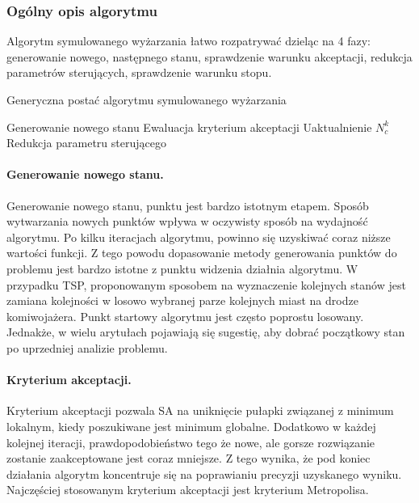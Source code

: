 \documentclass{article}
\begin{document}
\subsubsection{Ogólny opis algorytmu}
    Algorytm symulowanego wyżarzania łatwo rozpatrywać dzieląc na 4 fazy: generowanie nowego, następnego stanu, sprawdzenie warunku akceptacji, redukcja parametrów sterujących, sprawdzenie warunku stopu.
    \begin{algorithm}
        \caption{Generyczna postać algorytmu symulowanego wyżarzania}
        \begin{algorithmic}
                \STATE Generowanie nowego stanu
                \STATE Ewaluacja kryterium akceptacji
            \ENDFOR
            \STATE Uaktualnienie $N_c^k$
            \STATE Redukcja parametru sterującego
        \ENDWHILE
        \end{algorithmic}
    \end{algorithm}
    
    \paragraph{Generowanie nowego stanu.}
    Generowanie nowego stanu, punktu jest bardzo istotnym etapem. Sposób wytwarzania nowych punktów wpływa w oczywisty sposób na wydajność algorytmu. Po kilku iteracjach algorytmu, powinno się uzyskiwać coraz niższe wartości funkcji. Z tego powodu dopasowanie metody generowania punktów do problemu jest bardzo istotne z punktu widzenia działnia algorytmu. W przypadku TSP, proponowanym sposobem na wyznaczenie kolejnych stanów jest zamiana kolejności w losowo wybranej parze kolejnych miast na drodze komiwojażera.
    Punkt startowy algorytmu jest często poprostu losowany. Jednakże, w wielu arytułach pojawiają się sugestię, aby dobrać początkowy stan po uprzedniej analizie problemu.

    \paragraph{Kryterium akceptacji.}
    Kryterium akceptacji pozwala SA na uniknięcie pułapki związanej z minimum lokalnym, kiedy poszukiwane jest minimum globalne. Dodatkowo w każdej kolejnej iteracji, prawdopodobieństwo tego że nowe, ale gorsze rozwiązanie zostanie zaakceptowane jest coraz mniejsze. Z tego wynika, że pod koniec działania algorytm koncentruje się na poprawianiu precyzji uzyskanego wyniku.
Najczęściej stosowanym kryterium akceptacji jest kryterium Metropolisa.
\end{document}
